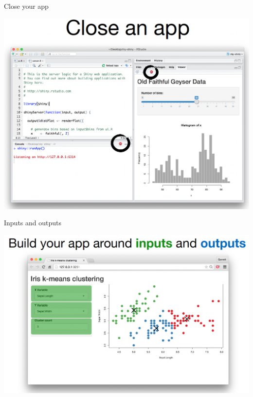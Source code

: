 \documentclass[
  ignorenonframetext,
]{beamer}
\begin{document}
\begin{frame}{Close your app}
\label{close-your-app}
\center

\includegraphics{shinyfigs/shiny_off.png}
\end{frame}

\begin{frame}{Inputs and outputs}
\label{inputs-and-outputs}
\center

\includegraphics{shinyfigs/shiny_in_out.png}
\end{frame}
\end{document}
